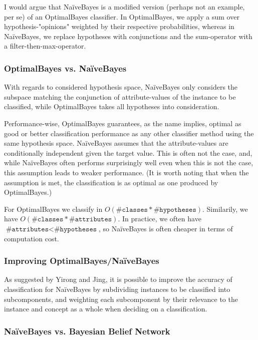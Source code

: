 \documentclass[paper=a4, fontsize=11pt]{scrartcl} %
\numberwithin{equation}{section} %
\numberwithin{figure}{section} %
\numberwithin{table}{section} %
\begin{document}
I would argue that NaïveBayes is a modified version (perhaps not an example, per se) of an OptimalBayes classifier.
In OptimalBayes, we apply a sum over hypothesis-"opinions" weighted by their respective probabilities, whereas in NaïveBayes, we replace hypotheses with conjunctions and the sum-operator with a filter-then-max-operator.

\subsubsection{OptimalBayes vs. NaïveBayes}

With regards to considered hypothesis space, NaïveBayes only considers the subspace matching the conjunction of attribute-values of the instance to be classified, while OptimalBayes takes all hypotheses into consideration.

Performance-wise, OptimalBayes guarantees, as the name implies, optimal as good or better classification performance as any other classifier method using the same hypothesis space.
NaïveBayes assumes that the attribute-values are conditionally independent given the target value.
This is often not the case, and, while NaïveBayes often performs surprisingly well even when this is not the case, this assumption leads to weaker performance. (It is worth noting that when the assumption is met, the classification is as optimal as one produced by OptimalBayes.)

For OptimalBayes we classify in $O(\texttt{\#classes} * \texttt{\#hypotheses})$.
Similarily, we have $O(\texttt{\#classes} * \texttt{\#attributes})$.
In practice, we often have $\texttt{\#attributes} < \texttt{\#hypotheses}$, so NaïveBayes is often cheaper in terms of computation cost.

\subsubsection{Improving OptimalBayes/NaïveBayes}

As suggested by Yirong and Jing\cite{bib:improving-naive-bayes}, it is possible to improve the accuracy of classification for NaïveBayes by subdividing instances to be classified into subcomponents, and weighting each subcomponent by their relevance to the instance and concept as a whole when deciding on a classification.

\subsubsection{NaïveBayes vs. Bayesian Belief Network}
\end{document}
